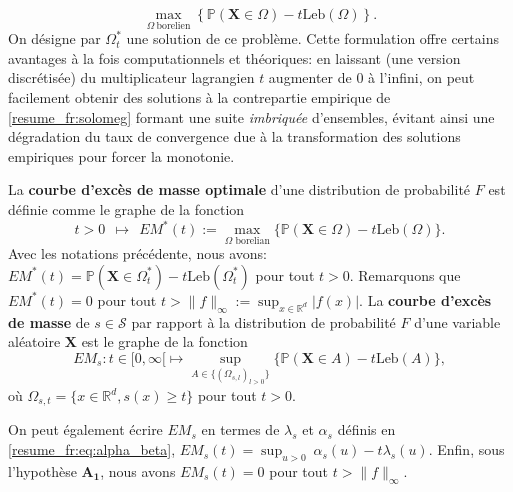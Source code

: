 \documentclass[a4paper, 12pt]{article}
\def\mb{\mathbf}
\def\rset{\mathbb{R}}
\def\leb{\text{Leb}}
\begin{document}
\begin{equation}
\label{resume_fr:solomeg}
\max_{\Omega~ \text{borelien}}  \left\{ \mathbb{P}(\mb X \in \Omega) - t \leb(\Omega) \right\}.
\end{equation}
On désigne par $ \Omega ^ * _ t $ une solution de ce problème. Cette formulation offre certains avantages à la fois computationnels et théoriques: en laissant (une version discrétisée) du multiplicateur lagrangien $ t $ augmenter de $ 0 $ à l'infini, on peut facilement obtenir des solutions à la contrepartie empirique de \eqref{resume_fr:solomeg} formant une suite \textit {imbriquée} d'ensembles, évitant ainsi une dégradation du taux de convergence due à la transformation des solutions empiriques pour forcer la monotonie.

%
La \textbf{courbe d'excès de masse optimale} d'une distribution de probabilité  $F$ est définie comme le graphe de la fonction
$$t>0~~\mapsto~~ EM^*(t):=\max_{\Omega\text{ borelian} } \{ {\mathbb{P}} (\mb X\in \Omega)-t\leb(\Omega) \}.$$ 
Avec les notations précédente, nous avons: $EM^*(t)=\mathbb{P}(\mb X \in \Omega_t^*)-t \leb(\Omega_t^*)$ pour tout $t>0$.
Remarquons que $EM^*(t) = 0$ pour tout $t>\|f\|_\infty:=\sup_{x\in \rset^d}\vert f(x)\vert$. 
%
  La \textbf{courbe d'excès de masse} de $s\in\mathcal{S}$ par rapport à la distribution de probabilité $F$ d'une variable aléatoire $\mb X$ est le graphe de la fonction
\begin{equation}
\label{resume_fr:EM}
EM_s : t \in [0, \infty[ \mapsto \sup_{A \in \{(\Omega_{s,l})_{l>0}\}}\{ {\mathbb{P}}(\mb X \in A) - t \leb(A)\},
\end{equation}
où $\Omega_{s,t}=\{ x \in \rset^d, s(x) \ge t \}$ pour tout $t>0$.

On peut également écrire $ EM_s $ en termes de $ \lambda_s $ et $ \alpha_s $ définis en \eqref{resume_fr:eq:alpha_beta}, $EM_s(t)= \sup_{u>0}~ \alpha_s(u) -t \lambda_s(u) $. Enfin, sous l'hypothèse $ \mathbf {A_1} $, nous avons $ EM_s (t) = 0 $ pour tout $t> \|f\|_\infty$.
\end{document}
